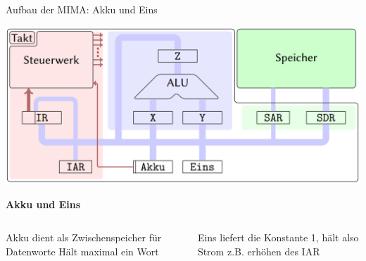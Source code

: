 \documentclass[handout]{beamer}
\begin{document}
\begin{frame}{Aufbau der MIMA: Akku und Eins}
	\begin{center}\includegraphics[width=.6\textwidth]{images/mima_aufbau.png}\end{center}
	
	\bp
	
	\textcolor{kit-orange50}{\textbf{Akku und Eins}}
	
	\begin{columns}
		\begin{column}{0.5\textwidth}
			\begin{itemize}
				\pitem Akku dient als Zwischenspeicher für Datenworte
				\pitem Hält maximal ein Wort
			\end{itemize}
		\end{column}
		
		\begin{column}{0.5\textwidth}
			\begin{itemize}
				\pitem Eins liefert die Konstante 1, hält also Strom
				\pitem z.B. erhöhen des IAR
			\end{itemize}
		\end{column}
	\end{columns}
	
\end{frame}
\end{document}

